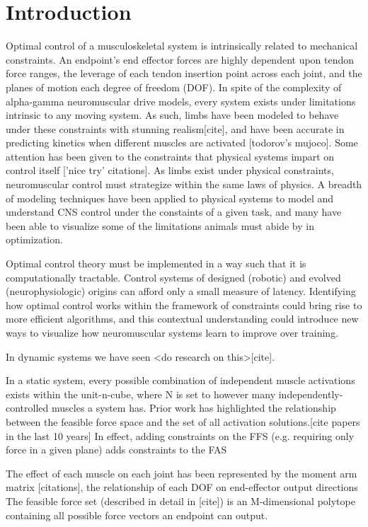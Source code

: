 \section{Introduction}

Optimal control of a musculoskeletal system is intrinsically related to mechanical constraints. An endpoint's end effector forces are highly dependent upon tendon force ranges, the leverage of each tendon insertion point across each joint, and the planes of motion each degree of freedom (DOF). In spite of the complexity of alpha-gamma neuromuscular drive models, every system exists under limitations intrinsic to any moving system. 
As such, limbs have been modeled to behave under these constraints with stunning realism[cite], and have been accurate in predicting kinetics when different muscles are activated [todorov's mujoco]. 
Some attention has been given to the constraints that physical systems impart on control itself ['nice try' citations]. 
As limbs exist under physical constraints, neuromuscular control must strategize within the same laws of physics. 
A breadth of modeling techniques have been applied to physical systems to model and understand CNS control under the constaints of a given task, and many have been able to visualize some of the limitations animals must abide by in optimization.

Optimal control theory must be implemented in a way such that it is computationally tractable. Control systems of designed (robotic) and evolved (neurophysiologic) origins can afford only a small measure of latency. Identifying how optimal control works within the framework of constraints could bring rise to more efficient algorithms, and this contextual understanding could introduce new ways to visualize how neuromuscular systems learn to improve over training.


In dynamic systems we have seen <do research on this>[cite].

In a static system, every possible combination of independent muscle activations exists within the unit-n-cube, where N is set to however many independently-controlled muscles a system has. Prior work has highlighted the relationship between the feasible force space and the set of all activation solutions.[cite papers in the last 10 years] In effect, adding constraints on the FFS (e.g. requiring only force in a given plane) adds constraints to the FAS

The effect of each muscle on each joint has been represented by the moment arm matrix [citations], the relationship of each DOF on end-effector output directions 
The feasible force set (described in detail in [cite]) is an M-dimensional polytope containing all possible force vectors an endpoint can output.

